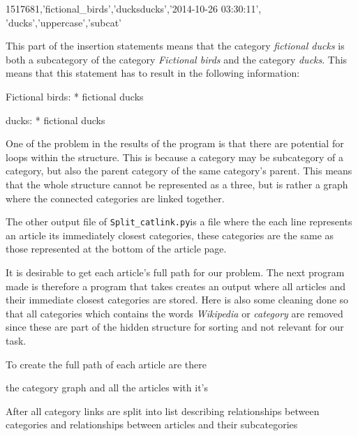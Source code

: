 \documentclass[11pt,english,a4paper]{article}
\newcommand{\catlinkprogram}{\texttt{Split\_catlink.py}}
\begin{document}
\begin{code}
1517681,'fictional_birds','ducks\nfictional ducks','2014-10-26 03:30:11',
'ducks','uppercase','subcat' 
\end{code}

This part of the insertion statements means that the category \emph{fictional ducks} is both a subcategory of the category \emph{Fictional birds} and the category \emph{ducks}. This means that this statement has to result in the following information: 
\begin{code}
Fictional birds: 
* fictional ducks

ducks:
* fictional ducks
\end{code}

One of the problem in the results of the program is that there are potential for loops within the structure. This is because a category may be subcategory of a category, but also the parent category of the same category's parent. This means that the whole structure cannot be represented as a three, but is rather a graph where the connected categories are linked together. 

The other output file of \catlinkprogram is a file where the each line represents an article its immediately closest categories, these categories are the same as those represented at the bottom of the article page. 

It is desirable to get each article's full path for our problem. The next program made is therefore a program that takes creates an output where all articles and their immediate closest categories are stored. Here is also some cleaning done so that all categories which contains the words \emph{Wikipedia} or \emph{category} are removed since these are part of the hidden structure for sorting and not relevant for our task. 

To create the full path of each article are there 

the category graph and all the articles with it's 


After all category links are split into list describing relationships between categories and relationships between articles and their subcategories 
\end{document}
